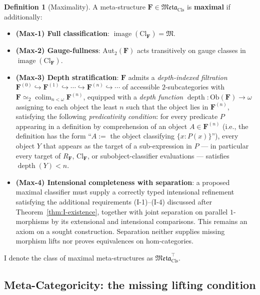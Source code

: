 \documentclass[11pt]{article}
\theoremstyle{plain}
\theoremstyle{definition}
\newtheorem{definition}[theorem]{Definition}
\newcommand{\fM}{\mathfrak{M}}
\newcommand{\Meta}{\mathfrak{Meta}}
\newcommand{\Ob}{\mathrm{Ob}}
\newcommand{\Cl}{\mathrm{Cl}}
\DeclareMathOperator{\colim}{colim}
\DeclareMathOperator{\image}{image}
\DeclareMathOperator{\dep}{depth}
\begin{document}
\begin{definition}[Maximality]\label{def:maximality}
A meta-structure $\mathbf{F} \in \Meta_{\mathrm{Cls}}$ is \textbf{maximal} if additionally:
\begin{itemize}
\item \textbf{(Max-1) Full classification}: $\image(\Cl_{\mathbf{F}}) = \fM$.
\item \textbf{(Max-2) Gauge-fullness}: $\mathrm{Aut}_2(\mathbf{F})$ acts transitively on gauge classes in $\image(\Cl_{\mathbf{F}})$.
\item \textbf{(Max-3) Depth stratification}: $\mathbf{F}$ admits a \emph{depth-indexed filtration} $\mathbf{F}^{(0)} \hookrightarrow \mathbf{F}^{(1)} \hookrightarrow \cdots \hookrightarrow \mathbf{F}^{(n)} \hookrightarrow \cdots$ of accessible $2$-subcategories with $\mathbf{F} \simeq_2 \colim_{n < \omega} \mathbf{F}^{(n)}$, equipped with a \emph{depth function} $\dep : \Ob(\mathbf{F}) \to \omega$ assigning to each object the least $n$ such that the object lies in $\mathbf{F}^{(n)}$, satisfying the following \emph{predicativity condition}: for every predicate $P$ appearing in a definition by comprehension of an object $A \in \mathbf{F}^{(n)}$ (i.e., the definition has the form ``$A :=$ the object classifying $\{x : P(x)\}$''), every object $Y$ that appears as the target of a sub-expression in $P$ --- in particular every target of $R_\mathbf{F}$, $\Cl_\mathbf{F}$, or subobject-classifier evaluations --- satisfies $\dep(Y) < n$.
\item \textbf{(Max-4) Intensional completeness with separation}: a proposed maximal classifier must supply a correctly typed intensional refinement satisfying the additional requirements (I-1)--(I-4) discussed after Theorem~\ref{thm:I-existence}, together with joint separation on parallel $1$-morphisms by its extensional and intensional comparisons. This remains an axiom on a sought construction. Separation neither supplies missing morphism lifts nor proves equivalences on hom-categories.
\end{itemize}
I denote the class of maximal meta-structures as $\Meta_{\mathrm{Cls}}^{\top}$.
\end{definition}

\subsection{Meta-Categoricity: the missing lifting condition}
\end{document}
